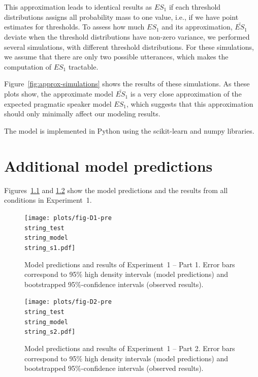 This approximation leads to identical results as $ES_1$ if each threshold distributions assigns all probability mass to one value, 
i.e., if we have point estimates for thresholds. To assess how much $ES_1$ and its approximation, $\widetilde{ES_1}$ deviate when 
the threshold distributions have non-zero variance, we performed several simulations, with different threshold distributions. For these
simulations, we assume that there are only two possible utterances, which makes the computation of $ES_1$ tractable.

Figure~\ref{fig:approx-simulations} shows the results of these simulations. As these plots show, the approximate model $\widetilde{ES_1}$ is a very close approximation of the expected
pragmatic speaker model $ES_1$, which suggests that this approximation should only minimally affect our modeling results. 

The model is implemented in Python using the scikit-learn \parencite{Scikit2011} and numpy \parencite{vanderWalt2011} libraries.

\chapter{Additional model predictions}


Figures~\ref{fig:norming-results-model-1} and \ref{fig:norming-results-model-2} show the model predictions and the results from all conditions in Experiment~1. 

\begin{figure}[h!]
\texttt{[image: plots/fig-D1-pre\\string\_test\\string\_model\\string\_s1.pdf]}
\caption{Model predictions and results of Experiment~1 -- Part 1. Error bars correspond to 95\% high density intervals (model predictions) and bootstrapped 95\%-confidence intervals (observed results). \label{fig:norming-results-model-1}}

\end{figure}

\begin{figure}[h!]
\texttt{[image: plots/fig-D2-pre\\string\_test\\string\_model\\string\_s2.pdf]}
\caption{Model predictions and results of Experiment~1  -- Part 2. Error bars correspond to 95\% high density intervals (model predictions) and bootstrapped 95\%-confidence intervals (observed results). \label{fig:norming-results-model-2}}

\end{figure}




